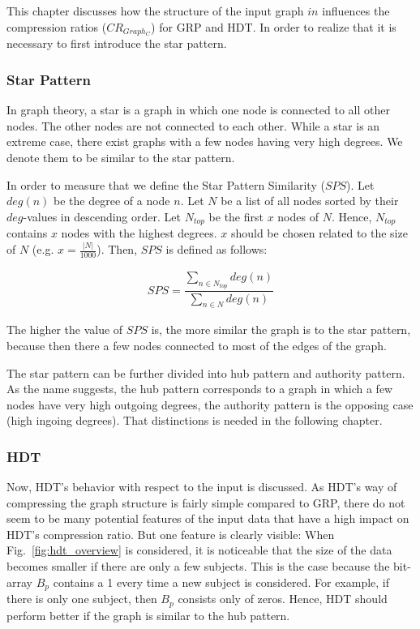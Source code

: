 This chapter discusses how the structure of the input graph $in$ influences the compression ratios ($CR_{Graph_C}$) for GRP and HDT. In order to realize that it is necessary to first introduce the star pattern.

\subsubsection{Star Pattern}

In graph theory, a star is a graph in which one node is connected to all other nodes. The other nodes are not connected to each other. While a star is an extreme case, there exist graphs with a few nodes having very high degrees. We denote them to be similar to the star pattern. 

In order to measure that we define the Star Pattern Similarity ($SPS$). Let $deg(n)$ be the degree of a node $n$. Let $N$ be a list of all nodes sorted by their $deg$-values in descending order.  Let $N_{top}$ be the first $x$ nodes of $N$. Hence, $N_{top}$ contains $x$ nodes with the highest degrees. $x$ should be chosen related to the size of $N$ (e.g. $x=\frac{|N|}{1000}$).  Then, $SPS$ is defined as follows:

\begin{align*}
SPS=\dfrac{\sum_{n \in N_{top}} deg(n)  }{\sum_{n \in N} deg(n)}
\end{align*}

The higher the value of $SPS$ is, the more similar the graph is to the star pattern, because then there a few nodes connected to most of the edges of the graph.

The star pattern can be further divided into hub pattern and authority pattern. As the name suggests, the hub pattern corresponds to a graph in which a few nodes have very high outgoing degrees, the authority pattern is the opposing case (high ingoing degrees). That distinctions is needed in the following chapter.

\subsubsection{HDT}

Now, HDT's behavior with respect to the input is discussed. As HDT's way of compressing the graph structure is fairly simple compared to GRP, there do not seem to be many potential features of the input data that have a high impact on HDT's compression ratio. But one feature is clearly visible: When Fig.~\ref{fig:hdt_overview} is considered, it is noticeable that the size of the data becomes smaller if there are only a few subjects. This is the case because the bit-array $B_p$ contains a 1 every time a new subject is considered. For example, if there is only one subject, then $B_p$ consists only of zeros. Hence, HDT should perform better if the graph is similar to the hub pattern.

